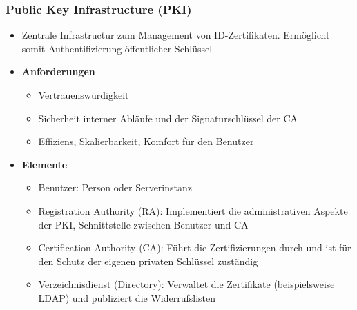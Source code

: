 \subsubsection{Public Key Infrastructure (PKI)}
\begin{itemize}
	\item Zentrale Infrastructur zum Management von ID-Zertifikaten. Ermöglicht somit Authentifizierung öffentlicher Schlüssel
	\item \textbf{Anforderungen}
	\begin{itemize}
		\item Vertrauenswürdigkeit
		\item Sicherheit interner Abläufe und der Signaturschlüssel der CA
		\item Effiziens, Skalierbarkeit, Komfort für den Benutzer
	\end{itemize}
	\item \textbf{Elemente}
	\begin{itemize}
		\item Benutzer: Person oder Serverinstanz
		\item Registration Authority (RA): Implementiert die administrativen Aspekte der PKI, Schnittstelle zwischen Benutzer und CA
		\item Certification Authority (CA): Führt die Zertifizierungen durch und ist für den Schutz der eigenen privaten Schlüssel zuständig
		\item Verzeichnisdienst (Directory): Verwaltet die Zertifikate (beispielsweise LDAP) und publiziert die Widerrufslisten
	\end{itemize}
\end{itemize}

